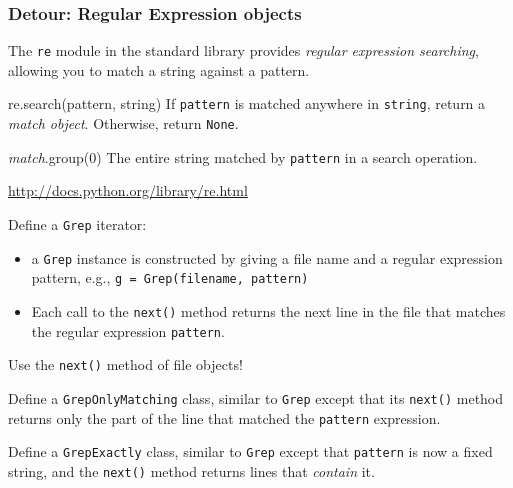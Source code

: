 \documentclass[english,serif,mathserif,xcolor=pdftex,dvipsnames,table]{beamer}
\begin{document}
\begin{frame}
  \frametitle{Detour: Regular Expression objects}
  The \texttt{re} module in the standard library provides
  \emph{regular expression searching}, allowing you to match a string
  against a pattern.

  \+
  \begin{describe}{re.search(pattern, string)}
    If \texttt{pattern} is matched anywhere in \texttt{string}, return
    a \emph{match object}.  Otherwise, return \texttt{None}.
  \end{describe}

  \+
  \begin{describe}{\emph{match}.group(0)}
    The entire string matched by \texttt{pattern} in a search operation.
  \end{describe}

  \+
  \begin{references}
    \url{http://docs.python.org/library/re.html}
  \end{references}
\end{frame}


\begin{frame}[fragile]
  \begin{exercise}
    Define a \texttt{Grep} iterator:
    \begin{itemize}
    \item a \texttt{Grep} instance is constructed by giving a file name and a regular expression pattern, e.g., \lstinline|g = Grep(filename, pattern)|
    \item Each call to the \texttt{next()} method returns the next line in the file that matches the regular expression \texttt{pattern}.
    \end{itemize}

    Use the \texttt{next()} method of file objects!
  \end{exercise}

  \+
  \begin{exercise}
    Define a \texttt{GrepOnlyMatching} class, similar to \texttt{Grep}
    except that its \texttt{next()} method returns only the part of
    the line that matched the \texttt{pattern} expression.
  \end{exercise}

  \+
  \begin{exercise}
    Define a \texttt{GrepExactly} class, similar to \texttt{Grep}
    except that \texttt{pattern} is now a fixed string, and the
    \texttt{next()} method returns lines that \emph{contain} it.
  \end{exercise}
\end{frame}
\end{document}
